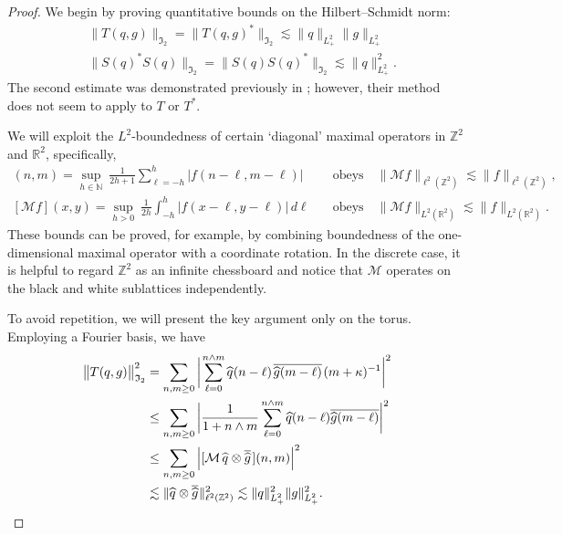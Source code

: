\documentclass{amsart}
\numberwithin{equation}{section}
\theoremstyle{definition}
\newcommand{\ka}{\kappa}
\newcommand{\N}{\mathbb{N}}
\newcommand{\Z}{\mathbb{Z}}
\newcommand{\R}{\mathbb{R}}
\newcommand{\I}{\mathfrak{I}}
\newcommand{\f}{\frac}
\newcommand{\qtq}[1]{\quad\text{#1}\quad}
\begin{document}
\begin{proof}
We begin by proving quantitative bounds on the Hilbert--Schmidt norm:
\begin{equation}\begin{aligned}\label{E:QHS}
&\|T(q,g)\|_{\I _2}= \|T(q,g)^*\|_{\I _2} \lesssim \|q\|_{L^2_+}\|g\|_{L^2_+} \\ 
&\|S(q)^*S(q)\|_{\I _2} = \|S(q)S(q)^*\|_{\I _2} \lesssim \|q\|_{L^2_+}^2 .
\end{aligned}\end{equation}
The second estimate was demonstrated previously in \cite{FrankRead}; however, their method does not seem to apply to $T$ or $T^*$.

We will exploit the $L^2$-boundedness of certain `diagonal' maximal operators in $\Z^2$ and $\R^2$, specifically,
\begin{align*}
[\mathcal{M} f](n,m)=\sup_{h\in\N}\ \tfrac{1}{2h+1}\sum_{\ell=-h}^h|f(n-\ell,m-\ell)| &\qtq{obeys} \|\mathcal{M}f\|_{\ell^2(\Z^2)}\lesssim \|f\|_{\ell^2(\Z^2)},\\
[\mathcal{M} f](x,y)=\sup_{h>0}\ \tfrac{1}{2h}\int_{-h}^h|f(x-\ell,y-\ell)|\,d\ell &\qtq{obeys} \|\mathcal{M}f\|_{L^2(\R^2)}\lesssim \|f\|_{L^2(\R^2)}.
\end{align*}
These bounds can be proved, for example, by combining boundedness of the one-dimensional maximal operator with a coordinate rotation.  In the discrete case, it is helpful to regard $\Z^2$ as an infinite chessboard and notice that $\mathcal{M}$ operates on the black and white sublattices independently.

To avoid repetition, we will present the key argument only on the torus.  Employing a Fourier basis, we have
\begin{align*}
\bigl\|T(q,g)\bigr\|_{\I _2}^2&=  \sum_{n,m \geq 0}\,\biggl|\mkern 2mu \sum_{\ell=0}^{n\wedge m} \widehat{q\mkern0.5mu} (n-\ell) 
	\mkern 2mu\overline{\widehat g(m-\ell)} \mkern 2mu (m+\ka)^{-1} \biggr|^2 \\
&\leq \sum_{n,m \geq 0}\,\biggl| \f{1}{1+n\wedge m}\sum_{\ell=0}^{n\wedge m} \widehat{q}(n-\ell)\overline{\widehat{g}(m-\ell)}\biggr|^2 \\
&\leq \sum_{n,m\geq 0} \, \Bigl| [\mathcal{M} \,\widehat{q\mkern0.5mu} \otimes \overline{\widehat g}\mkern2mu] (n,m)\Bigr|^2\\
&\lesssim  \| \widehat{q\mkern0.5mu} \otimes \overline{\widehat g}\mkern1mu \|_{\ell^2(\Z^2)}^2 \lesssim  \|q\|_{L^2_+}^2\|g\|_{L^2_+}^2 .
\end{align*}


\end{proof}
\end{document}
